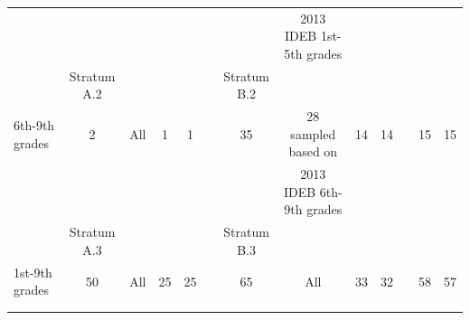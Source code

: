 \documentclass[
	article,			%
	12pt,				%
	oneside,			%
	a4paper,			%
	]{article}
\begin{document}
\begin{landscape}
\begin{table}[htbp]
\begin{threeparttable}
\begin{tabular}{lcccccccccccc}
           &            &            &            &            &            &            & 2013 IDEB 1st-5th grades &            &            &            &            &            \\
  & Stratum A.2           &            &            &            &           &  Stratum B.2  \\
6th-9th grades &          2 &        All &          1 &          1 &            &         35 & 28 sampled based on  &         14 &         14 &            &         15 &         15 \\

           &            &            &            &            &            &            & 2013 IDEB 6th-9th grades &            &            &            &            &            \\
  & Stratum A.3           &            &            &            &           &  Stratum B.3  \\
1st-9th grades &         50 &        All &         25 &         25 &            &         65 &        All &         33 &         32 &            &         58 &         57 \\

           &            &            &            &            &            &            &            &            &            &            &            &            \\

           &            &            &            &            &            &            &            &            &            &            &            &            \\


\end{tabular}
\end{threeparttable}
\end{table}
\end{landscape}
\end{document}

